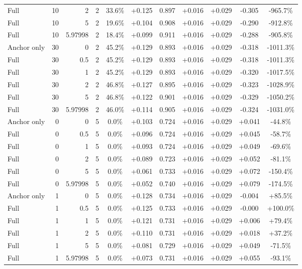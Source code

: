 \begin{table}[htbp]
\begin{tabular}{lrrrccccccc}
Full & 10 & 2 & 2 & 33.6\% & +0.125 & 0.897 & +0.016 & +0.029 & -0.305 & -965.7\% \\
Full & 10 & 5 & 2 & 19.6\% & +0.104 & 0.908 & +0.016 & +0.029 & -0.290 & -912.8\% \\
Full & 10 & 5.97998 & 2 & 18.4\% & +0.099 & 0.911 & +0.016 & +0.029 & -0.288 & -905.8\% \\
Anchor only & 30 & 0 & 2 & 45.2\% & +0.129 & 0.893 & +0.016 & +0.029 & -0.318 & -1011.3\% \\
Full & 30 & 0.5 & 2 & 45.2\% & +0.129 & 0.893 & +0.016 & +0.029 & -0.318 & -1011.3\% \\
Full & 30 & 1 & 2 & 45.2\% & +0.129 & 0.893 & +0.016 & +0.029 & -0.320 & -1017.5\% \\
Full & 30 & 2 & 2 & 46.8\% & +0.127 & 0.895 & +0.016 & +0.029 & -0.323 & -1028.9\% \\
Full & 30 & 5 & 2 & 46.8\% & +0.122 & 0.901 & +0.016 & +0.029 & -0.329 & -1050.2\% \\
Full & 30 & 5.97998 & 2 & 46.0\% & +0.114 & 0.905 & +0.016 & +0.029 & -0.324 & -1031.0\% \\
Anchor only & 0 & 0 & 5 & 0.0\% & +0.103 & 0.724 & +0.016 & +0.029 & +0.041 & -44.8\% \\
Full & 0 & 0.5 & 5 & 0.0\% & +0.096 & 0.724 & +0.016 & +0.029 & +0.045 & -58.7\% \\
Full & 0 & 1 & 5 & 0.0\% & +0.093 & 0.724 & +0.016 & +0.029 & +0.049 & -69.6\% \\
Full & 0 & 2 & 5 & 0.0\% & +0.089 & 0.723 & +0.016 & +0.029 & +0.052 & -81.1\% \\
Full & 0 & 5 & 5 & 0.0\% & +0.061 & 0.733 & +0.016 & +0.029 & +0.072 & -150.4\% \\
Full & 0 & 5.97998 & 5 & 0.0\% & +0.052 & 0.740 & +0.016 & +0.029 & +0.079 & -174.5\% \\
Anchor only & 1 & 0 & 5 & 0.0\% & +0.128 & 0.734 & +0.016 & +0.029 & -0.004 & +85.5\% \\
Full & 1 & 0.5 & 5 & 0.0\% & +0.125 & 0.733 & +0.016 & +0.029 & -0.000 & +100.0\% \\
Full & 1 & 1 & 5 & 0.0\% & +0.121 & 0.731 & +0.016 & +0.029 & +0.006 & +79.4\% \\
Full & 1 & 2 & 5 & 0.0\% & +0.110 & 0.731 & +0.016 & +0.029 & +0.018 & +37.2\% \\
Full & 1 & 5 & 5 & 0.0\% & +0.081 & 0.729 & +0.016 & +0.029 & +0.049 & -71.5\% \\
Full & 1 & 5.97998 & 5 & 0.0\% & +0.073 & 0.731 & +0.016 & +0.029 & +0.055 & -93.1\% \\

\end{tabular}
\end{table}
